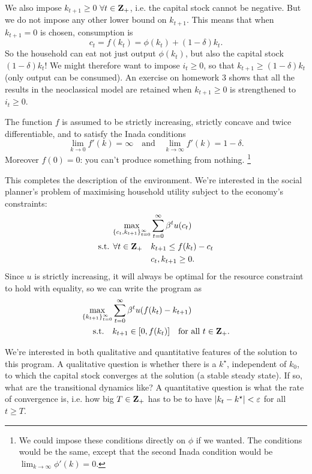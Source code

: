 \documentclass[11pt,letterpaper,reqno,oneside]{article}
\begin{document}
We also impose $k_{t+1} \geq 0$ $\forall t \in \mathbf{Z}_+$, i.e. the capital stock cannot be negative. But we do not impose any other lower bound on $k_{t+1}$. This means that when $k_{t+1}=0$ is chosen, consumption is 
%
\begin{equation*}
	c_t = f(k_t) = \phi(k_t) + (1-\delta) k_t .
\end{equation*}
%
So the household can eat not just output $\phi(k_t)$, but also the capital stock $(1-\delta) k_t$! We might therefore want to impose $i_t \geq 0$, so that $k_{t+1} \geq (1-\delta) k_t$ (only output can be consumed). An exercise on homework 3 shows that all the results in the neoclassical model are retained when $k_{t+1} \geq 0$ is strengthened to $i_t \geq 0$.

The function $f$ is assumed to be strictly increasing, strictly concave and twice differentiable, and to satisfy the Inada conditions
%
\begin{equation*}
	\lim_{k \to 0} f'(k) = \infty
	\quad\text{and}\quad
	\lim_{k \to \infty} f'(k) = 1-\delta .
\end{equation*}
%
Moreover $f(0) = 0$: you can't produce something from nothing.%
	\footnote{We could impose these conditions directly on $\phi$ if we wanted. The conditions would be the same, except that the second Inada condition would be $\lim_{k \to \infty} \phi'(k) = 0$.}


This completes the description of the environment. We're interested in the social planner's problem of maximising household utility subject to the economy's constraints:
%
\begin{align*}
	\max_{\{c_t,k_{t+1}\}_{t=0}^\infty} 
	& \sum_{t=0}^\infty \beta^t u(c_t)
	\\
	\text{s.t. $\forall t \in \mathbf{Z}_+$}\quad
	& k_{t+1} \leq f(k_t) - c_t
	\\
	& c_t, k_{t+1} \geq 0 .
\end{align*}
%
Since $u$ is strictly increasing, it will always be optimal for the resource constraint to hold with equality, so we can write the program as
%
\begin{align*}
	\max_{ \{k_{t+1}\}_{t=0}^\infty } 
	&\sum_{t=0}^\infty \beta^t u( f(k_t) - k_{t+1} ) 
	\\
	\quad\text{s.t.}\quad
	&k_{t+1} \in [0,f(k_t)]
	\quad\text{for all $t \in \mathbf{Z}_+$} .
\end{align*}

We're interested in both qualitative and quantitative features of the solution to this program. A qualitative question is whether there is a $k^\star$, independent of $k_0$, to which the capital stock converges at the solution (a stable steady state). If so, what are the transitional dynamics like? A quantitative question is what the rate of convergence is, i.e. how big $T \in \mathbf{Z}_+$ has to be to have $\lvert k_t - k^\star \rvert < \varepsilon$ for all $t \geq T$.
\end{document}
